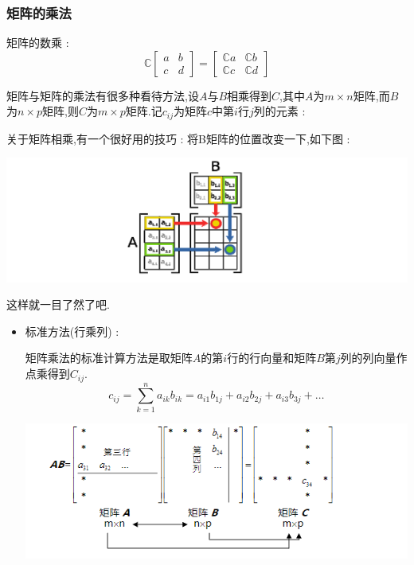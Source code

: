 \documentclass[UTF8,12pt]{ctexbook}
\newcommand{\upDownSum}[2]{\sum\limits_{#2}^{#1}}
\newcommand{\mathConstant}{\mathbb{C}}
\begin{document}
{{{{  \subsubsection{矩阵的乘法}{
    矩阵的数乘 :
    $$
      \mathConstant\begin{bmatrix}
        a & b \\
        c & d
      \end{bmatrix}
      =
      \begin{bmatrix}
        \mathConstant a & \mathConstant b \\
        \mathConstant c & \mathConstant d
      \end{bmatrix}
    $$

    矩阵与矩阵的乘法有很多种看待方法,设$A$与$B$相乘得到$C$,其中$A$为$m \times n$矩阵,而$B$为$n \times p$矩阵,则$C$为$m \times p$矩阵.记$c_{ij}$为矩阵$c$中第$i$行$j$列的元素 :

    关于矩阵相乘,有一个很好用的技巧 : 将B矩阵的位置改变一下,如下图 :

    \begin{center}
      \includegraphics{resources/MatrixMultiplecation_trick.png}

      \small{这样就一目了然了吧.}
    \end{center}

    \begin{itemize}
      \item {
            标准方法(行乘列) :

            矩阵乘法的标准计算方法是取矩阵$A$的第$i$行的行向量和矩阵$B$第$j$列的列向量作点乘得到$C_{ij}$.
            $$
              c_{ij} = \upDownSum{n}{k = 1}a_{ik}b_{ik} = a_{i1}b_{1j} + a_{i2}b_{2j} + a_{i3}b_{3j} + \dots
            $$

            \begin{center}
              \includegraphics{resources/MatrixMultiple_1.png}
            \end{center}

}
\end{itemize}}}}}}
\end{document}
